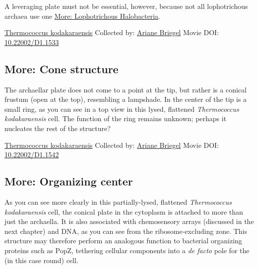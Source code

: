 \documentclass[]{tufte-book}
\begin{document}
A leveraging plate must not be essential, however, because not all lophotrichous archaea use one \protect\hyperlink{Lophotrichous_Halobacteria}{More: Lophotrichous Halobacteria}.



\hypertarget{htmlwidget-c5b9e715363d7c6f4e43}{}

\label{fig:6-9}\protect\hyperlink{tree}{Thermococcus kodakaraensis} Collected by: \protect\hyperlink{ariane_briegel}{Ariane Briegel} Movie DOI: \href{https://doi.org/10.22002/D1.1533}{10.22002/D1.1533}

\hypertarget{Cone_structure}{%
\subsection*{More: Cone structure}\label{Cone_structure}}

The archaellar plate does not come to a point at the tip, but rather is a conical frustum (open at the top), resembling a lampshade. In the center of the tip is a small ring, as you can see in a top view in this lysed, flattened \emph{Thermococcus kodakaraensis} cell. The function of the ring remains unknown; perhaps it nucleates the rest of the structure?



\hypertarget{htmlwidget-9cb2e6b5cc97d6e56ba8}{}

\label{fig:6-9a}\protect\hyperlink{tree}{Thermococcus kodakaraensis} Collected by: \protect\hyperlink{ariane_briegel}{Ariane Briegel} Movie DOI: \href{https://doi.org/10.22002/D1.1542}{10.22002/D1.1542}

\hypertarget{Organizing_center}{%
\subsection*{More: Organizing center}\label{Organizing_center}}

As you can see more clearly in this partially-lysed, flattened \emph{Thermococcus kodakaraensis} cell, the conical plate in the cytoplasm is attached to more than just the archaella. It is also associated with chemosensory arrays (discussed in the next chapter) and DNA, as you can see from the ribosome-excluding zone. This structure may therefore perform an analogous function to bacterial organizing proteins such as PopZ, tethering cellular components into a \emph{de facto} pole for the (in this case round) cell.
\end{document}
